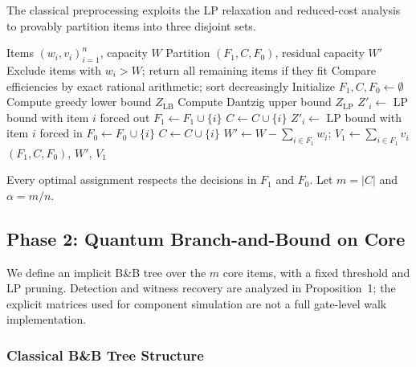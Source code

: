 \documentclass[pdflatex,sn-mathphys-num]{sn-jnl}
\begin{document}
The classical preprocessing exploits the LP relaxation and reduced-cost analysis to provably partition items into three disjoint sets.

\begin{algorithm}[h]
\caption{Reduced-Cost Variable Fixing}
\label{alg:filter}
\begin{algorithmic}[1]
\REQUIRE Items $(w_i, v_i)_{i=1}^n$, capacity $W$
\ENSURE Partition $(F_1, C, F_0)$, residual capacity $W'$
\STATE Exclude items with $w_i>W$; return all remaining items if they fit
\STATE Compare efficiencies by exact rational arithmetic; sort decreasingly
\STATE Initialize $F_1,C,F_0\leftarrow\emptyset$
\STATE Compute greedy lower bound $Z_{\text{LB}}$
\STATE Compute Dantzig upper bound $Z_{\text{LP}}$
        \STATE $Z'_i \leftarrow$ LP bound with item $i$ forced out
            \STATE $F_1 \leftarrow F_1 \cup \{i\}$ 
        \ELSE
            \STATE $C \leftarrow C \cup \{i\}$
        \ENDIF
    \ELSE
        \STATE $Z'_i \leftarrow$ LP bound with item $i$ forced in
            \STATE $F_0 \leftarrow F_0 \cup \{i\}$ 
        \ELSE
            \STATE $C \leftarrow C \cup \{i\}$
        \ENDIF
    \ENDIF
\ENDFOR
\STATE $W' \leftarrow W - \sum_{i \in F_1} w_i$; $V_1 \leftarrow \sum_{i \in F_1} v_i$
\RETURN $(F_1, C, F_0)$, $W'$, $V_1$
\end{algorithmic}
\end{algorithm}

Every optimal assignment respects the decisions in $F_1$ and $F_0$. Let $m = |C|$ and $\alpha = m/n$.

\subsection{Phase 2: Quantum Branch-and-Bound on Core}

We define an implicit B\&B tree over the $m$ core items, with a fixed threshold and LP pruning. Detection and witness recovery are analyzed in Proposition~1; the explicit matrices used for component simulation are not a full gate-level walk implementation.

\subsubsection{Classical B\&B Tree Structure}
\end{document}
